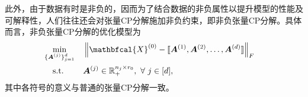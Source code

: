 此外，由于数据有时是非负的，因而为了结合数据的非负属性以提升模型的性能及可解释性，人们往往还会对张量CP分解施加非负约束，即非负张量CP分解。具体而言，非负张量CP分解的优化模型为
\begin{equation*}\label{cp-nn}
	\begin{aligned}
		&\underset{\mathclap{\{\boldsymbol{A}^{(j)}\}_{j=1}^{d}}}{\min}\quad&& \left\|\mathbfcal{X}^{(0)}-\llbracket \boldsymbol{A}^{(1)}, \boldsymbol{A}^{(2)}, \ldots, \boldsymbol{A}^{(d)} \rrbracket\right\|_{F} \\
		&\text{s.t.} &&\boldsymbol{A}^{(j)}\in \mathbb{R}_{+}^{n_j \times r_{0}},~\forall~j\in[d],
	\end{aligned}
\end{equation*}
其中各符号的意义与普通的张量CP分解一致。

